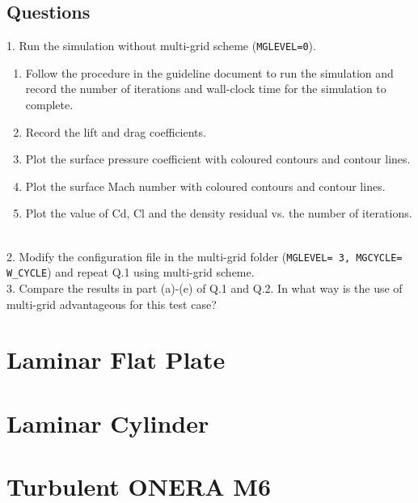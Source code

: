 \section{Questions}
1. Run the simulation without multi-grid scheme (\texttt{MGLEVEL=0}).
\begin{enumerate}[label=(\alph*)]
    \item Follow the procedure in the guideline document to run the simulation and record the number of iterations and wall-clock time for the simulation to complete.
    \item Record the lift and drag coefficients.
    \item Plot the surface pressure coefficient with coloured contours and contour lines.
    \item Plot the surface Mach number with coloured contours and contour lines.
    \item Plot the value of Cd, Cl and the density residual vs. the number of iterations.
\end{enumerate}\\
2. Modify the configuration file in the multi-grid folder (\texttt{MGLEVEL= 3, MGCYCLE= W\_CYCLE}) and repeat Q.1 using multi-grid scheme.\\
3. Compare the results in part (a)-(e) of Q.1 and Q.2. In what way is the use of multi-grid advantageous for this test case?\\
\chapter{Laminar Flat Plate}

\chapter{Laminar Cylinder}

\chapter{Turbulent ONERA M6}
